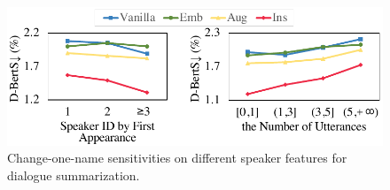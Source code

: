 \begin{figure}[h]
	\centering
	\includegraphics[scale=0.55]{speaker-sensitivity.pdf}
	
	\caption{Change-one-name sensitivities on different speaker features for dialogue summarization.}%
	\label{fig:trends}
\end{figure}












